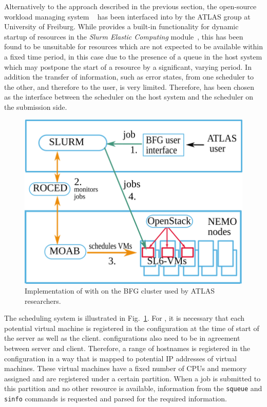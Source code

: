Alternatively to the approach described in the previous section, the
open-source workload managing system \Slurm~\cite{Slurm} has been interfaced into \Roced by
the ATLAS group at University of Freiburg.
While \Slurm provides a built-in functionality for dynamic
startup of resources in the \textit{Slurm Elastic Computing} module~\cite{SlurmElastic}, this has been found to be unsuitable for resources which are not
expected to be available within a fixed time period, in this case due to
the presence of a queue in the host system which may postpone the start
of a resource by a significant, varying period.
In addition the transfer of information, such as error states, from one scheduler to the
other, and therefore to the user, is very limited.
Therefore, \Roced has been chosen as the interface between the
\Moab scheduler on the host system and the \Slurm
scheduler on the submission side.


\begin{figure}

\includegraphics[width=0.95\linewidth]{figures/virtualisierung_ROCED.png}
\caption{Implementation of \Roced with \Slurm on the BFG cluster used by ATLAS researchers.}
\label{fig:slurmRocedBFG}
\end{figure}

The scheduling system is illustrated in Fig.~\ref{fig:slurmRocedBFG}.
For \Slurm, it is necessary that each potential virtual
machine is registered in the configuration at the time of start of the
\Slurm server as well as the client. \Slurm configurations also
need to be in agreement between server and client.
Therefore, a range of hostnames is registered in the configuration in
a way that is mapped to potential IP addresses of virtual machines.
These virtual machines have a fixed number of CPUs and memory assigned and are
registered under a certain \Slurm partition.
When a job is submitted to this partition and no other resource is
available, information from the \Slurm \texttt{squeue} and
\texttt{sinfo} commands is requested and parsed for the required information.

